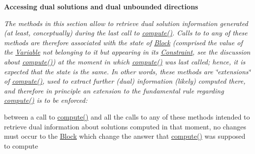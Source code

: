 \begin{Indent}\textbf{ Accessing dual solutions and dual unbounded directions}\par
{\em The methods in this section allow to retrieve dual solution information generated (at least, conceptually) during the last call to \mbox{\hyperlink{class_s_m_spp__di__unipi__it_1_1_solver_a504d4e3e174c7a518cc66156a8a45ce5}{compute()}}. Calls to to any of these methods are therefore associated with the state of \mbox{\hyperlink{class_s_m_spp__di__unipi__it_1_1_block}{Block}} (comprised the value of the \mbox{\hyperlink{class_s_m_spp__di__unipi__it_1_1_variable}{Variable}} not belonging to it but appearing in its \mbox{\hyperlink{class_s_m_spp__di__unipi__it_1_1_constraint}{Constraint}}, see the discussion about \mbox{\hyperlink{class_s_m_spp__di__unipi__it_1_1_solver_a504d4e3e174c7a518cc66156a8a45ce5}{compute()}}) at the moment in which \mbox{\hyperlink{class_s_m_spp__di__unipi__it_1_1_solver_a504d4e3e174c7a518cc66156a8a45ce5}{compute()}} was last called; hence, it is expected that the state is the same. In other words, these methods are \char`\"{}extensions\char`\"{} of \mbox{\hyperlink{class_s_m_spp__di__unipi__it_1_1_solver_a504d4e3e174c7a518cc66156a8a45ce5}{compute()}}, used to extract further (dual) information (likely) computed there, and therefore in principle an extension to the fundamental rule regarding \mbox{\hyperlink{class_s_m_spp__di__unipi__it_1_1_solver_a504d4e3e174c7a518cc66156a8a45ce5}{compute()}} is to be enforced\+:

between a call to \mbox{\hyperlink{class_s_m_spp__di__unipi__it_1_1_solver_a504d4e3e174c7a518cc66156a8a45ce5}{compute()}} and all the calls to any of these methods intended to retrieve dual information about solutions computed in that moment, no changes must occur to the \mbox{\hyperlink{class_s_m_spp__di__unipi__it_1_1_block}{Block}} which change the answer that \mbox{\hyperlink{class_s_m_spp__di__unipi__it_1_1_solver_a504d4e3e174c7a518cc66156a8a45ce5}{compute()}} was supposed to compute

}
\end{Indent}
